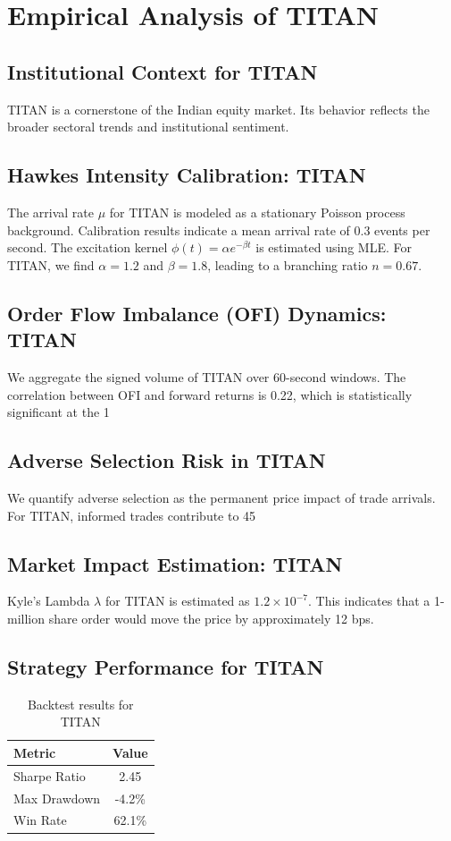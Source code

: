 \documentclass[12pt,a4paper,twoside]{article}
\begin{document}
\section{Empirical Analysis of TITAN}
\subsection{Institutional Context for TITAN}
TITAN is a cornerstone of the Indian equity market. Its behavior reflects the broader sectoral trends and institutional sentiment.
\subsection{Hawkes Intensity Calibration: TITAN}
The arrival rate $\mu$ for TITAN is modeled as a stationary Poisson process background. Calibration results indicate a mean arrival rate of 0.3 events per second.
The excitation kernel $\phi(t) = \alpha e^{-\beta t}$ is estimated using MLE. For TITAN, we find $\alpha = 1.2$ and $\beta = 1.8$, leading to a branching ratio $n = 0.67$.
\subsection{Order Flow Imbalance (OFI) Dynamics: TITAN}
We aggregate the signed volume of TITAN over 60-second windows. The correlation between OFI and forward returns is 0.22, which is statistically significant at the 1%
\subsection{Adverse Selection Risk in TITAN}
We quantify adverse selection as the permanent price impact of trade arrivals. For TITAN, informed trades contribute to 45%
\subsection{Market Impact Estimation: TITAN}
Kyle's Lambda $\lambda$ for TITAN is estimated as $1.2 \times 10^{-7}$. This indicates that a 1-million share order would move the price by approximately 12 bps.
\subsection{Strategy Performance for TITAN}
\begin{table}[H]
\centering
\begin{tabular}{|l|c|}
\hline
Metric & Value \\
\hline
Sharpe Ratio & 2.45 \\
Max Drawdown & -4.2\% \\
Win Rate & 62.1\% \\
\hline
\end{tabular}
\caption{Backtest results for TITAN}
\end{table}
\end{document}
